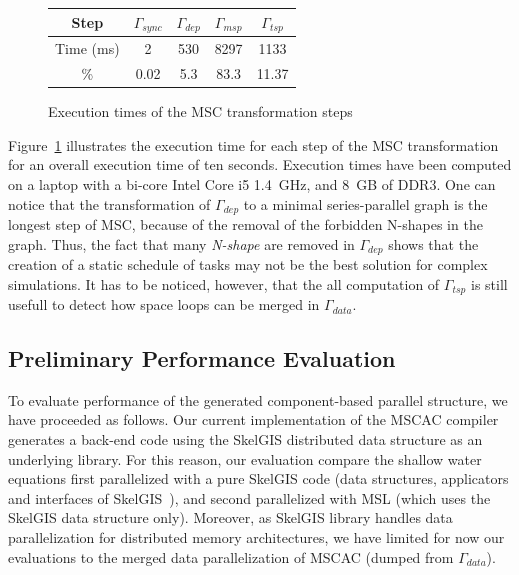 \begin{figure}[!h]
 \begin{center}
 \begin{tabular}{|c|c|c|c|c|}
  \hline
   Step & $\Gamma_{sync}$ & $\Gamma_{dep}$ & $\Gamma_{msp}$ & $\Gamma_{tsp}$\\
   \hline
   Time (ms) & 2 & 530 & 8297 & 1133\\
   \hline
   \% & 0.02 & 5.3 & 83.3 & 11.37\\
   \hline
 \end{tabular}
\caption{Execution times of the MSC transformation steps}
\label{fig:exectime}
 \end{center}
\end{figure}

Figure~\ref{fig:exectime} illustrates the execution time for each step of the MSC transformation for an overall execution time of ten seconds. Execution times have been computed on a laptop with a bi-core Intel Core i5 1.4~GHz, and 8~GB of DDR3. 
One can notice that the transformation of $\Gamma_{dep}$ to a minimal series-parallel graph is the longest step of MSC, because of the removal of the forbidden N-shapes in the graph. %
Thus, the fact that many \emph{N-shape} are removed in $\Gamma_{dep}$ shows that the creation of a static schedule of tasks may not be the best solution for complex simulations. It has to be noticed, however, that the all computation of $\Gamma_{tsp}$ is still usefull to detect how space loops can be merged in $\Gamma_{data}$.

\subsection{Preliminary Performance Evaluation}
To evaluate performance of the generated component-based parallel structure, we have proceeded as follows. Our current implementation of the MSCAC compiler generates a back-end code using the SkelGIS distributed data structure as an underlying library. For this reason, our evaluation compare the shallow water equations first parallelized with a pure SkelGIS code (data structures, applicators and interfaces of SkelGIS~\cite{CPE:CPE3494}), and second parallelized with MSL (which uses the SkelGIS data structure only). Moreover, as SkelGIS library handles data parallelization for distributed memory architectures, we have limited for now our evaluations to the merged data parallelization of MSCAC (dumped from $\Gamma_{data}$). 


